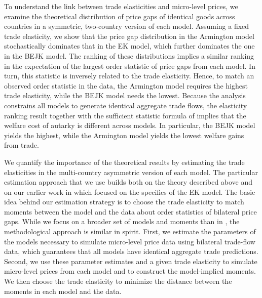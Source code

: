 \documentclass[12pt,dvips, ps2pdf]{article}
\begin{document}
To understand the link between trade elasticities and micro-level prices, we examine the theoretical distribution of price gaps of identical goods across countries in a symmetric, two-country version of each model. Assuming a fixed trade elasticity, we show that the price gap distribution in the Armington model stochastically dominates that in the EK model, which further dominates the one in the BEJK model. The ranking of these distributions implies a similar ranking in the expectation of the largest order statistic of price gaps from each model. In turn, this statistic is inversely related to the trade elasticity. Hence, to match an observed order statistic in the data, the Armington model requires the highest trade elasticity, while the BEJK model needs the lowest. Because the analysis constrains all models to generate identical aggregate trade flows, the elasticity ranking result together with the sufficient statistic formula of \citet{acr09} implies that the welfare cost of autarky is different across models. In particular, the BEJK model yields the highest, while the Armington model yields the lowest welfare gains from trade.

We quantify the importance of the theoretical results by estimating the trade elasticities in the multi-country asymmetric version of each model. The particular estimation approach that we use builds both on the theory described above and on our earlier work in \citet{sw_jie} which focused on the specifics of the EK model. The basic idea behind our estimation strategy is to choose the trade elasticity to match moments between the model and the data about order statistics of bilateral price gaps. While we focus on a broader set of models and moments than in \citet{sw_jie}, the methodological approach is similar in spirit. First, we estimate the parameters of the models necessary to simulate micro-level price data using bilateral trade-flow data, which guarantees that all models have identical aggregate trade predictions. Second, we use these parameter estimates and a given trade elasticity to simulate micro-level prices from each model and to construct the model-implied moments. We then choose the trade elasticity to minimize the distance between the moments in each model and the data.
\end{document}
